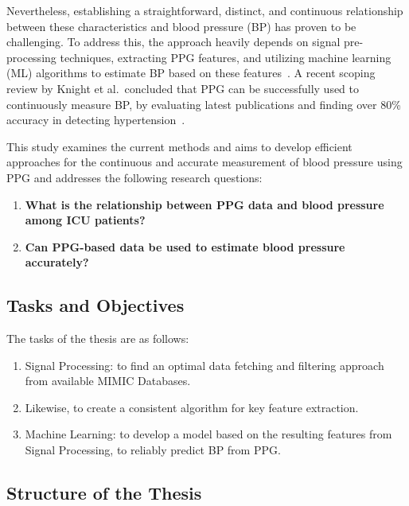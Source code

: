 Nevertheless, establishing a straightforward, distinct, and continuous relationship between these characteristics and blood pressure (BP) has proven to be challenging.
To address this, the approach heavily depends on signal pre-processing techniques, extracting PPG features, and utilizing machine learning (ML) algorithms to estimate BP based on these features~\cite{el-hajjDeepLearningModels2021}.
A recent scoping review by Knight et al.\ concluded that PPG can be successfully used to continuously measure BP, by evaluating latest publications and finding over 80\% accuracy in detecting hypertension~\cite{knightAccuracyWearablePhotoplethysmography2022}.

This study examines the current methods and aims to develop efficient approaches for the continuous and accurate measurement of blood pressure using PPG and addresses the following research questions:

\begin{enumerate}
    \item \textbf{What is the relationship between PPG data and blood pressure among ICU patients?}

    \item \textbf{Can PPG-based data be used to estimate blood pressure accurately?}

\end{enumerate}

\subsection{Tasks and Objectives}
\label{subsec:tasks_objectives}

The tasks of the thesis are as follows:

\begin{enumerate}
    \item Signal Processing: to find an optimal data fetching and filtering approach from available MIMIC Databases.
    \item Likewise, to create a consistent algorithm for key feature extraction.
    \item Machine Learning: to develop a model based on the resulting features from Signal Processing, to reliably predict BP from PPG\@.
\end{enumerate}

\subsection{Structure of the Thesis}
\label{subsec:structure}

